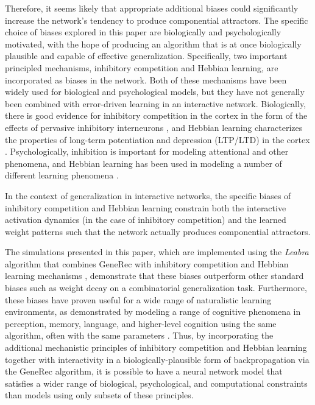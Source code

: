 \documentclass[12pt,twoside]{article}
\begin{document}
Therefore, it seems likely that appropriate additional biases could
significantly increase the network's tendency to produce componential
attractors.  The specific choice of biases explored in this paper are
biologically and psychologically motivated, with the hope of producing
an algorithm that is at once biologically plausible and capable of
effective generalization.  Specifically, two important principled
mechanisms, inhibitory competition and Hebbian learning, are
incorporated as biases in the network.  Both of these mechanisms have
been widely used for biological and psychological models, but they
have not generally been combined with error-driven learning in an
interactive network.  Biologically, there is good evidence for
inhibitory competition in the cortex in the form of the effects of
pervasive inhibitory interneurons \cite[e.g.,]{GabbotSomogyi86}, and
Hebbian learning characterizes the properties of long-term
potentiation and depression (LTP/LTD) in the cortex
\cite[e.g.,]{Bear96}.  Psychologically, inhibition is important for
modeling attentional and other phenomena, and Hebbian learning has
been used in modeling a number of different learning phenomena
\cite[e.g.,]{MillerKellerStryker89}.

In the context of generalization in interactive networks, the specific
biases of inhibitory competition and Hebbian learning constrain both
the interactive activation dynamics (in the case of inhibitory
competition) and the learned weight patterns such that the network
actually produces componential attractors.

The simulations presented in this paper, which are implemented using
the {\em Leabra} algorithm that combines GeneRec with inhibitory
competition and Hebbian learning mechanisms
\cite{OReilly96phd,OReilly98,OReillyMunakata00,OReillyRudy99tr},
demonstrate that these biases outperform other standard biases such as
weight decay on a combinatorial generalization task.  Furthermore,
these biases have proven useful for a wide range of naturalistic
learning environments, as demonstrated by modeling a range of
cognitive phenomena in perception, memory, language, and higher-level
cognition using the same algorithm, often with the same parameters
\cite{OReillyMunakata00}.  Thus, by incorporating the additional
mechanistic principles of inhibitory competition and Hebbian learning
together with interactivity in a biologically-plausible form of
backpropagation via the GeneRec algorithm, it is possible to have a
neural network model that satisfies a wider range of biological,
psychological, and computational constraints than models using only
subsets of these principles.
\end{document}
